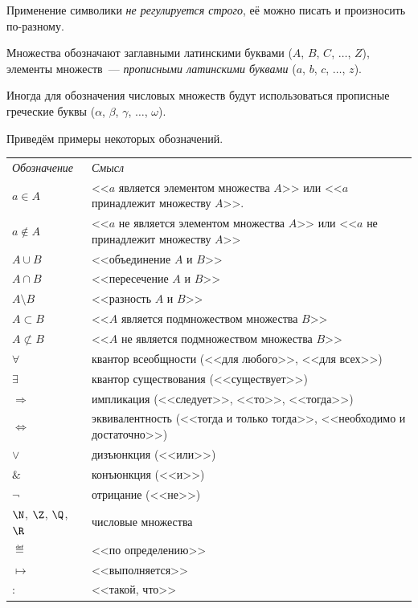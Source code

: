 \setcounter{section}{-1}

Применение символики \textit{не регулируется строго}, её можно писать и произносить по-разному.

Множества обозначают заглавными латинскими буквами (\(A\), \(B\), \(C\), \(\dots\), \(Z\)),
элементы множеств~--- \textit{прописными латинскими буквами} (\(a\), \(b\), \(c\), \(\dots\), \(z\)).

Иногда для обозначения числовых множеств будут использоваться прописные греческие буквы (\(\alpha\),
\(\beta\), \(\gamma\), \(\dots\), \(\omega\)).

Приведём примеры некоторых обозначений.

\vspace{-8pt}
\begin{table}[H]
\begin{tabular}{ll}
\textit{Обозначение} & \textit{Смысл}\\
\(a \in A\) & <<\(a\) является элементом множества \(A\)>> или <<\(a\) принадлежит множеству
    \(A\)>>.\\
\(a \notin A\) & <<\(a\) не является элементом множества \(A\)>> или <<\(a\) не принадлежит
    множеству \(A\)>>\\
\(A \cup B\) & <<объединение \(A\) и \(B\)>>\\
\(A \cap B\) & <<пересечение \(A\) и \(B\)>>\\
\(A \setminus B\) & <<разность \(A\) и \(B\)>>\\
\(A \subset B\) & <<\(A\) является подмножеством множества \(B\)>>\\
\(A \not\subset B\) & <<\(A\) не является подмножеством множества \(B\)>>\\
\(\forall\) & квантор всеобщности (<<для любого>>, <<для всех>>)\\
\(\exists\) & квантор существования (<<существует>>)\\
\(\Rightarrow\) & импликация (<<следует>>, <<то>>, <<тогда>>)\\
\(\Leftrightarrow\) & эквивалентность (<<тогда и только тогда>>, <<необходимо и достаточно>>)\\
\(\lor\) & дизъюнкция (<<или>>)\\
\(\&\) & конъюнкция (<<и>>)\\
\(\neg\) & отрицание (<<не>>)\\
\(\N\), \(\Z\), \(\Q\), \(\R\) & числовые множества \\
\(\eqdef\) & <<по определению>> \\
\(\mapsto\) & <<выполняется>> \\
\(:\) & <<такой, что>> \\
\end{tabular}
\end{table}
\vspace{-14pt}

